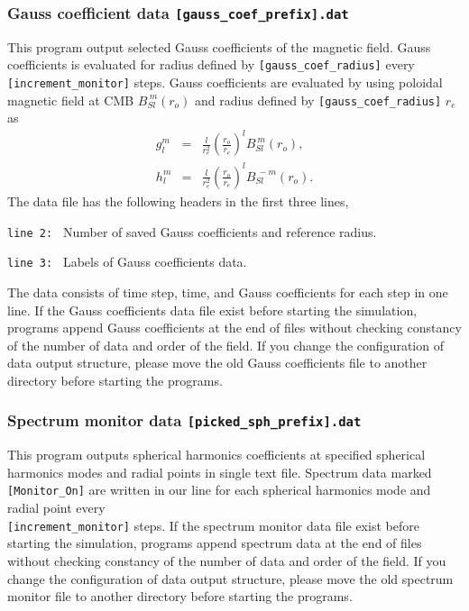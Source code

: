 \subsubsection{Gauss coefficient data {\tt [gauss\_coef\_prefix].dat}}
This program output selected Gauss coefficients of the magnetic field. Gauss coefficients is evaluated for radius defined by \verb|[gauss_coef_radius]| every \verb|[increment_monitor]| steps. Gauss coefficients are evaluated by using poloidal magnetic field at CMB $B_{Sl}^{\ m}(r_{o})$ and radius defined by \verb|[gauss_coef_radius]| $r_{e}$ as
%
\begin{eqnarray}
g_{l}^{m} &=& \frac{l}{r_{e}^2} \left(\frac{r_{o}}{r_{e}}\right)^{l} B_{Sl}^{\ m}(r_{o}),
\nonumber \\
h_{l}^{m} &=& \frac{l}{r_{e}^2} \left(\frac{r_{o}}{r_{e}}\right)^{l} B_{Sl}^{\ -m}(r_{o}).
\nonumber
\end{eqnarray}
%
The data file has the following headers in the first three lines,
%
\begin{description}
\item{\tt  line 2: } Number of saved Gauss coefficients and reference radius.
\item{\tt  line 3: } Labels of Gauss coefficients data.
\end{description}
%
The data consists of time step, time, and Gauss coefficients for each step in one line. If the Gauss coefficients data file exist before starting the simulation, programs append Gauss coefficients at the end of files without checking constancy of the number of data and order of the field. If you change the configuration of data output structure, please move the old Gauss coefficients file to another directory before starting the programs.

\subsubsection{Spectrum monitor data {\tt [picked\_sph\_prefix].dat}}
\label{sec:pickup_spectr_ctl}
This program outputs spherical harmonics coefficients at specified spherical harmonics modes and radial points in single text file. Spectrum data marked \verb|[Monitor_On]| are written in our line for each spherical harmonics mode and radial point every \\
\verb|[increment_monitor]| steps. If the spectrum monitor data file exist before starting the simulation, programs append spectrum data at the end of files without checking constancy of the number of data and order of the field. If you change the configuration of data output structure, please move the old spectrum monitor file to another directory before starting the programs.

